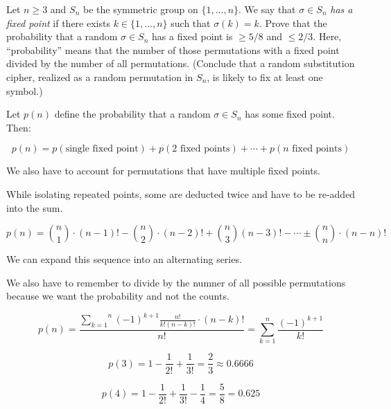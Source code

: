 
\begin{problem}
Let $n \geq 3$ and $S_n$ be the symmetric group on $\{1,\dotsc,n\}$.
We say that $\sigma \in S_n$ \emph{has a fixed point} if there exists
$k \in \{1,\dotsc,n\}$ such that $\sigma(k)=k$.  Prove that the
probability that a random $\sigma \in S_n$ has a fixed point is $\geq
5/8$ and $\leq 2/3$.  Here, ``probability'' means that the number of
those permutations with a fixed point divided by the number of all
permutations.  (Conclude that a random substitution cipher, realized
as a random permutation in $S_n$, is likely to fix at least one
symbol.)
\end{problem}
  

\begin{Answer}

Let $p(n)$ define the probability that a random $\sigma \in S_n$ has some fixed point.
Then:

\begin{equation}
p(n) = p(\text{single fixed point}) + p(\text{$2$ fixed points}) + \cdots + p(\text{$n$ fixed points})
\end{equation}

\noindent
We also have to account for permutations that have multiple fixed points.

\noindent
While isolating repeated points, some are deducted twice and have to be re-added into the sum.

\begin{equation}
p(n) = {n \choose 1} \cdot (n - 1)! - {n \choose 2} \cdot (n - 2)! + {n \choose 3} (n - 3)! -\cdots \pm {n \choose n} \cdot (n - n)!
\end{equation}

\noindent
We can expand this sequence into an alternating series.

\noindent
We also have to remember to divide by the numner of all possible permutations because we want the probability and not the counts.

\begin{equation}
p(n) = \frac{\overset{n}{\underset{k=1}{\sum}} {(-1)}^{k + 1} \frac{n!}{k!(n-k)!}\cdot(n-k)!}{n!} = \overset{n}{\underset{k=1}{\sum}} \frac{(-1)^{k + 1}}{k!}
\end{equation}

\begin{equation}
p(3) = 1 - \frac{1}{2!} + \frac{1}{3!} = \frac{2}{3} \approx 0.6666
\end{equation}

\begin{equation}
p(4) = 1 - \frac{1}{2!} + \frac{1}{3!} - \frac{1}{4} = \frac{5}{8} = 0.625
\end{equation}


\end{Answer}

